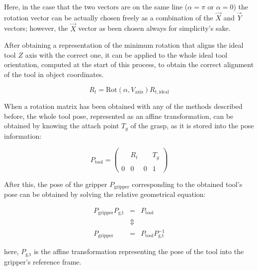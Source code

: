 Here, in the case that the two vectors are on the same line
($\alpha=\pi$ or $\alpha=0$) the rotation vector can be actually
chosen freely as a combination of the $\vec{X}$ and $\vec{Y}$ vectors;
however, the $\vec{X}$ vector as been chosen always for simplicity's sake.

After obtaining a representation of the minimum rotation  that
aligns the ideal tool $Z$ axis with the correct one, it can be applied
to the whole ideal tool orientation, computed at the start of this
process, to obtain the correct alignment of the tool in object
coordinates.

\begin{equation}
  R_t=\text{Rot}(\alpha,V_{\text{axis}}) R_{t,\text{ideal}}
\end{equation}

When a rotation matrix has been obtained with any of the methods
described before, the whole tool pose, represented as an affine
transformation, can be obtained by knowing the attach point $T_g$ of
the grasp, as it is stored into the pose information: 

\begin{equation}
  P_{\text{tool}}=\left( \begin{array}{ccc|c}
    &&& \\
    &R_t& & T_g \\
    &&& \\
    \hline 
    0 & 0 & 0 & 1
  \end{array} \right)
\end{equation}

After this, the pose of the gripper $P_{\text{gripper}}$ corresponding to the obtained
tool's pose can be obtained by solving the relative geometrical
equation:

\begin{eqnarray}
  P_{\text{gripper}} P_{\text{g,t}} &=& P_{\text{tool}} \\
  & \Updownarrow & \nonumber \\
  P_{\text{gripper}} &=& P_{\text{tool}}P_{\text{g,t}}^{-1}
\end{eqnarray}

here, $P_{\text{g,t}}$ is the affine transformation representing the
pose of the tool into the gripper's reference frame.

